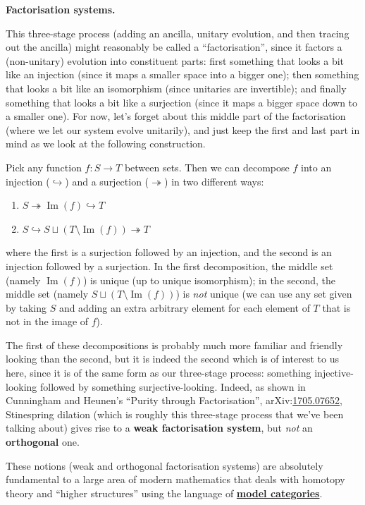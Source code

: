 \documentclass[fleqn,a4paper]{article}
\providecommand{\tightlist}{\setlength{\itemsep}{0pt}\setlength{\parskip}{0pt}}
\newenvironment{technical}[1]{\textbf{#1.}\par\vspace{.5\baselineskip}\everypar{\setlength{\parindent}{1.5em}}}{}
\theoremstyle{definition}
\theoremstyle{definition}
\theoremstyle{definition}
\theoremstyle{definition}
\theoremstyle{remark}
\begin{document}
\begin{technical}{Factorisation systems}
This three-stage process (adding an ancilla, unitary evolution, and then tracing out the ancilla) might reasonably be called a ``factorisation'', since it factors a (non-unitary) evolution into constituent parts: first something that looks a bit like an injection (since it maps a smaller space into a bigger one); then something that looks a bit like an isomorphism (since unitaries are invertible); and finally something that looks a bit like a surjection (since it maps a bigger space down to a smaller one).
For now, let's forget about this middle part of the factorisation (where we let our system evolve unitarily), and just keep the first and last part in mind as we look at the following construction.

Pick any function \(f\colon S\to T\) between sets.
Then we can decompose \(f\) into an injection (\(\hookrightarrow\)) and a surjection (\(\twoheadrightarrow\)) in two different ways:

\begin{enumerate}
\def\labelenumi{\arabic{enumi}.}
\tightlist
\item
  \(S\twoheadrightarrow\operatorname{Im}(f)\hookrightarrow T\)
\item
  \(S\hookrightarrow S\sqcup(T\setminus\operatorname{Im}(f))\twoheadrightarrow T\)
\end{enumerate}

where the first is a surjection followed by an injection, and the second is an injection followed by a surjection.
In the first decomposition, the middle set (namely \(\operatorname{Im}(f)\)) is unique (up to unique isomorphism); in the second, the middle set (namely \(S\sqcup(T\setminus\operatorname{Im}(f))\)) is \emph{not} unique (we can use any set given by taking \(S\) and adding an extra arbitrary element for each element of \(T\) that is not in the image of \(f\)).

The first of these decompositions is probably much more familiar and friendly looking than the second, but it is indeed the second which is of interest to us here, since it is of the same form as our three-stage process: something injective-looking followed by something surjective-looking.
Indeed, as shown in Cunningham and Heunen's ``Purity through Factorisation'', arXiv:\href{https://arxiv.org/abs/1705.07652}{1705.07652}, Stinespring dilation (which is roughly this three-stage process that we've been talking about) gives rise to a \textbf{weak factorisation system}, but \emph{not} an \textbf{orthogonal} one.

These notions (weak and orthogonal factorisation systems) are absolutely fundamental to a large area of modern mathematics that deals with homotopy theory and ``higher structures'' using the language of \href{https://en.wikipedia.org/wiki/Model_category}{\textbf{model categories}}.

\end{technical}
\end{document}
